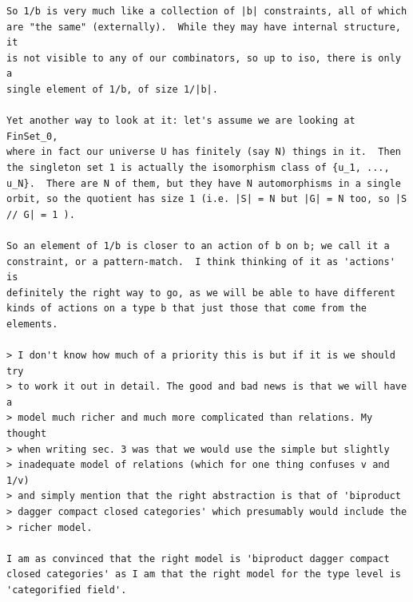\documentclass{llncs}
\begin{document}
\begin{verbatim}
So 1/b is very much like a collection of |b| constraints, all of which 
are "the same" (externally).  While they may have internal structure, it 
is not visible to any of our combinators, so up to iso, there is only a 
single element of 1/b, of size 1/|b|.

Yet another way to look at it: let's assume we are looking at FinSet_0, 
where in fact our universe U has finitely (say N) things in it.  Then 
the singleton set 1 is actually the isomorphism class of {u_1, ..., 
u_N}.  There are N of them, but they have N automorphisms in a single 
orbit, so the quotient has size 1 (i.e. |S| = N but |G| = N too, so |S 
// G| = 1 ).

So an element of 1/b is closer to an action of b on b; we call it a 
constraint, or a pattern-match.  I think thinking of it as 'actions' is 
definitely the right way to go, as we will be able to have different 
kinds of actions on a type b that just those that come from the elements.

> I don't know how much of a priority this is but if it is we should try
> to work it out in detail. The good and bad news is that we will have a
> model much richer and much more complicated than relations. My thought
> when writing sec. 3 was that we would use the simple but slightly
> inadequate model of relations (which for one thing confuses v and 1/v)
> and simply mention that the right abstraction is that of 'biproduct
> dagger compact closed categories' which presumably would include the
> richer model.

I am as convinced that the right model is 'biproduct dagger compact 
closed categories' as I am that the right model for the type level is 
'categorified field'.

\end{verbatim}


 

\end{document}
